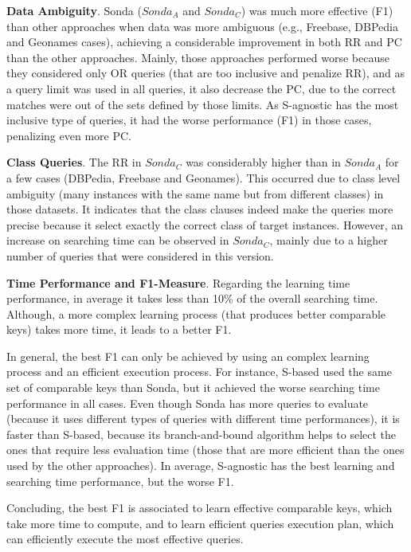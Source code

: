 \begin{center}
\begin{table*}[h]
\begin{tabular}{|c|l|c|c|c|c|c|c|c|c|c|}
\end{tabular}  
\end{table*} 
\end{center}

\textbf{Data Ambiguity}. Sonda ($Sonda_A$ and $Sonda_C$) was much more effective (F1) than other approaches when data was more ambiguous  (e.g., Freebase, DBPedia and Geonames cases), achieving a considerable improvement in both RR and PC than the other approaches. Mainly, those approaches performed worse because they considered only OR queries (that are too inclusive and penalize RR),  and as a query limit was used in all queries, it also decrease the PC, due to the correct matches were out of the sets defined by those limits. As S-agnostic has the most inclusive type of queries, it had the worse performance (F1) in those cases, penalizing even more PC.

\textbf{Class Queries}. The RR in $Sonda_C$ was considerably higher than in $Sonda_A$ for a few cases (DBPedia, Freebase and Geonames). This occurred due to class level ambiguity (many instances with the same name but from different classes) in those datasets. It indicates that the class clauses indeed make the queries more precise because it select exactly the correct class of target instances. However, an increase on searching time can be observed in $Sonda_C$, mainly due to a higher number of queries that were considered in this version.

\textbf{Time Performance and F1-Measure}. Regarding the learning time performance, in average it takes less than 10\% of the overall searching time. Although, a more complex learning process (that produces better comparable keys) takes more time, it leads to a better F1. 

In general, the best F1 can only be achieved by using an complex learning process and an efficient execution process. For instance, S-based used the same set of comparable keys than Sonda, but it achieved the worse searching time performance in all cases. Even though Sonda has more queries to evaluate (because it uses different types of queries with different time performances), it is faster than S-based, because its  branch-and-bound algorithm helps to select the ones that require less evaluation time (those that are more efficient than the ones used by the other approaches).  In average, S-agnostic has the best learning and searching time performance, but the worse F1. 

Concluding, the best F1 is associated to learn effective comparable keys, which take more time to compute, and to learn efficient queries execution plan, which can efficiently execute the most effective queries. 
 

